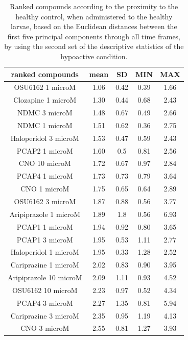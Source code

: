 \documentclass[a4paper,12pt]{article}
\begin{document}
\begin{table}[h!]\tiny
\centering
\caption{Ranked compounds according to the proximity to the healthy control, when administered to the healthy larvae, based on the Euclidean distances between the first five principal components through all time frames, by using the second set of the descriptive statistics of the hypoactive condition.}
\begin{tabular}{|c|c|c|c|c|}
\hline
ranked compounds             & mean & SD   & MIN  & MAX   \\ \hline
OSU6162 1 microM       & 1.06 & 0.42 & 0.39 & 1.66  \\ \hline
Clozapine 1 microM     & 1.30  & 0.44 & 0.68 & 2.43  \\ \hline
NDMC 3 microM          & 1.48 & 0.67 & 0.49 & 2.66  \\ \hline
NDMC 1 microM          & 1.51 & 0.62 & 0.36 & 2.75  \\ \hline
Haloperidol 3 microM   & 1.53 & 0.47 & 0.59 & 2.43  \\ \hline
PCAP2 1 microM         & 1.60  & 0.5  & 0.81 & 2.56  \\ \hline
CNO 10 microM          & 1.72 & 0.67 & 0.97 & 2.84  \\ \hline
PCAP4 1 microM       & 1.73 & 0.73 & 0.79 & 3.64  \\ \hline
CNO 1 microM           & 1.75 & 0.65 & 0.64 & 2.89  \\ \hline
OSU6162 3 microM       & 1.87 & 0.88 & 0.56 & 3.77  \\ \hline
Aripiprazole 1 microM  & 1.89 & 1.8  & 0.56 & 6.93  \\ \hline
PCAP1 1 microM         & 1.94 & 0.92 & 0.80  & 3.65  \\ \hline
PCAP1 3 microM         & 1.95 & 0.53 & 1.11 & 2.77  \\ \hline
Haloperidol 1 microM   & 1.95 & 0.33 & 1.28 & 2.52  \\ \hline
Cariprazine 1 microM   & 2.02 & 0.83 & 0.90  & 3.95  \\ \hline
Aripiprazole 10 microM & 2.09 & 1.11 & 0.93 & 4.52  \\ \hline
OSU6162 10 microM      & 2.23 & 0.97 & 0.52 & 4.34  \\ \hline
PCAP4 3 microM       & 2.27 & 1.35 & 0.81 & 5.94  \\ \hline
Cariprazine 3 microM   & 2.35 & 0.95 & 1.19 & 4.13  \\ \hline
CNO 3 microM           & 2.55 & 0.81 & 1.27 & 3.93  \\ \hline

\end{tabular}
\end{table}
\end{document}
